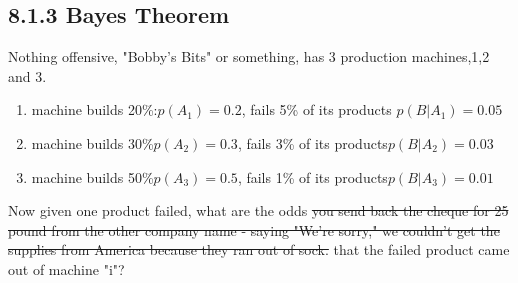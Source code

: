 \subsection{8.1.3 Bayes Theorem}
Nothing offensive, "Bobby's Bits" or something, has 3 production machines,1,2 and 3. 
\begin{enumerate}
    \item machine builds 20\%:$p(A_1)=0.2$, fails 5\% of its products $p(B|A_1)=0.05$ 
    \item machine builds 30\%$p(A_2)=0.3$, fails 3\% of its products$p(B|A_2)=0.03$
    \item machine builds 50\%$p(A_3)=0.5$, fails 1\% of its products$p(B|A_3)=0.01$
\end{enumerate}
Now given one product failed, what are the odds \st{you send back the cheque for 25 pound from the other company name - saying "We're sorry," we couldn't get the supplies from America because they ran out of sock.} that the failed product came out of machine "i"?

